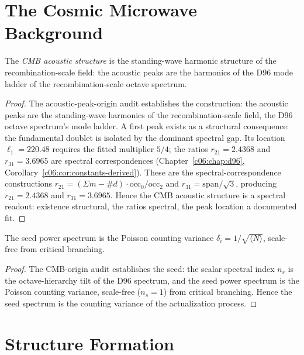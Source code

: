 \section{The Cosmic Microwave Background}
\label{c12:sec:cmb}

\begin{theorem}
\label{c12:thm:acoustic}
The \emph{CMB acoustic structure} is the standing-wave harmonic structure of the
recombination-scale field: the acoustic peaks are the harmonics of the D96 mode ladder of
the recombination-scale octave spectrum.
\end{theorem}

\begin{proof}
The acoustic-peak-origin audit \cite{c12:QG238} establishes the construction: the acoustic peaks
are the standing-wave harmonics of the recombination-scale field, the D96 octave spectrum's
mode ladder. A first peak exists as a structural consequence: the fundamental doublet is
isolated by the dominant spectral gap. Its location $\ell_1 = 220.48$ requires the fitted
multiplier $5/4$; the ratios $r_{21} = 2.4368$ and $r_{31} = 3.6965$ are spectral
correspondences (Chapter~\ref{c06:chap:d96}, Corollary~\ref{c06:cor:constants-derived}).
These are the spectral-correspondence constructions
$r_{21} = (\Sigma m-\#d)\cdot\mathrm{occ}_0/\mathrm{occ}_2$ and
$r_{31} = \mathrm{span}/\sqrt{3}$, producing $r_{21} = 2.4368$ and $r_{31} = 3.6965$.
Hence the CMB acoustic structure is a spectral readout: existence structural, the ratios
spectral, the peak location a documented fit.
\end{proof}

\begin{lemma}
\label{c12:lem:seed-spectrum}
The seed power spectrum is the Poisson counting variance $\delta_i = 1/\sqrt{\langle N
\rangle}$, scale-free from critical branching.
\end{lemma}

\begin{proof}
The CMB-origin audit \cite{c12:QG237} establishes the seed: the scalar spectral index
$n_s$ is the octave-hierarchy tilt of the D96 spectrum, and the seed power spectrum is the
Poisson counting variance, scale-free ($n_s = 1$) from critical branching. Hence the seed
spectrum is the counting variance of the actualization process.
\end{proof}

\section{Structure Formation}
\label{c12:sec:structure}

